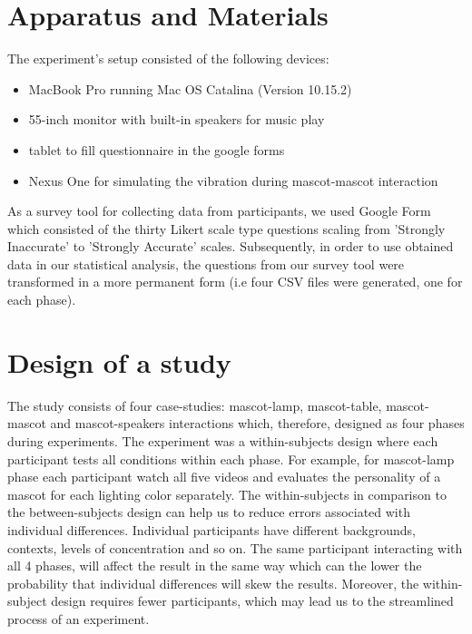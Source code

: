 \section{Apparatus and Materials}
\label{sec:apparatus-and-materials}
The experiment’s setup consisted of the following devices:
\begin{itemize}
  \item MacBook Pro running Mac OS Catalina (Version 10.15.2)
  \item 55-inch monitor with built-in speakers for music play
  \item tablet to fill questionnaire in the google forms
  \item Nexus One for simulating the vibration during mascot-mascot interaction
\end{itemize}

As a survey tool for collecting data from participants, we used Google Form which consisted
of the thirty Likert scale type questions scaling from 'Strongly Inaccurate' to 'Strongly Accurate' scales.
Subsequently, in order to use obtained data in our statistical analysis, the questions
from our survey tool were transformed in a more permanent form (i.e four CSV files were generated, one for each phase).

\section{Design of a study}
\label{sec:design-of-a-study}
The study consists of four case-studies: mascot-lamp, mascot-table, mascot-mascot and mascot-speakers
interactions which, therefore, designed as four phases during experiments.
The experiment was a within-subjects design where each participant tests all conditions within each phase.
For example, for mascot-lamp phase each participant watch all five videos and
evaluates the personality of a mascot for each lighting color separately.
The within-subjects in comparison to the between-subjects design can help us to
reduce errors associated with individual differences.
Individual participants have different backgrounds, contexts, levels of concentration and so on.
The same participant interacting with all 4 phases, will affect the result in the same way
which can the lower the probability that individual differences will skew the results.
Moreover, the within-subject design requires fewer participants, which may lead
us to the streamlined process of an experiment.

